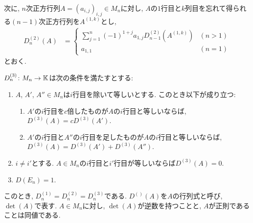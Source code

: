 次に, 
$n$次正方行列$A=(a_{i,j})_{i,j}\in M_n$に対し,
$A$の$1$行目と$k$列目を忘れて得られる$(n-1)$次正方行列を$A^{(1,k)}$とし,
\begin{align*}
D_n^{(2)}(A)
&=
\begin{cases}
\sum_{j=1}^{n} (-1)^{1+j}a_{1,j}D_{n-1}^{(2)}(A^{(1,k)}) & (n>1)\\
a_{1,1}&(n=1)
\end{cases}
\end{align*}
とおく.

$D^{(3)}_n\colon M_n \to \mathbb{K}$は次の条件を満たすとする:
\begin{enumerate}
\item $A$, $A'$, $A''\in M_n$は$i$行目を除いて等しいとする. このとき以下が成り立つ:
\begin{enumerate}
\item $A'$の$i$行目を$c$倍したものが$A$の$i$行目と等しいならば, $D^{(3)}(A)=c D^{(3)}(A')$.
\item $A'$の$i$行目と$A''$の$i$行目を足したものが$A$の$i$行目と等しいならば, $D^{(3)}(A)=D^{(3)}(A')+D^{(3)}(A'')$.
\end{enumerate}
\item $i\neq i'$とする.  $A\in M_n$の$i$行目と$i'$行目が等しいならば$D^{(3)}(A)=0$.
\item $D(E_n)=1$.
\end{enumerate}

このとき, $D^{(1)}_n=D^{(2)}_n=D^{(3)}_n$である.
$D^{()}(A)$を$A$の行列式と呼び, $\det(A)$で表す.
$A\in M_n$に対し,
$\det(A)$が逆数を持つことと, $A$が正則であることは同値である.


